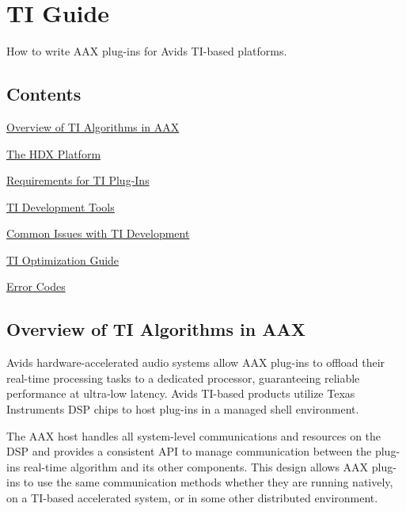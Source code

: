 \hypertarget{a00362}{}\section{T\+I Guide}
\label{a00362}
How to write A\+A\+X plug-\/ins for Avid\textquotesingle{}s T\+I-\/based platforms. 

\hypertarget{a00362_aax_ti_guide_contents}{}\subsection{Contents}\label{a00362_aax_ti_guide_contents}
\begin{DoxyItemize}
\item \hyperlink{a00362_aax_ti_guide_00_overview_of_ti_algorithms}{Overview of T\+I Algorithms in A\+A\+X} \item \hyperlink{a00362_aax_ti_guide_01_the_hdx_platform}{The H\+D\+X Platform} \item \hyperlink{a00362_aax_ti_guide_03_requirements_for_ti_plug_ins}{Requirements for T\+I Plug-\/\+Ins} \item \hyperlink{a00362_aax_ti_guide_04_ti_development_tools}{T\+I Development Tools} \item \hyperlink{a00362_aax_ti_guide_05_common_issues_with_ti_development}{Common Issues with T\+I Development} \item \hyperlink{a00362_aax_ti_guide_06_ti_optimization_guide}{T\+I Optimization Guide} \item \hyperlink{a00362_aax_ti_guide_07_error_codes}{Error Codes}\end{DoxyItemize}
 \hypertarget{a00362_aax_ti_guide_00_overview_of_ti_algorithms}{}\subsection{Overview of T\+I Algorithms in A\+A\+X}\label{a00362_aax_ti_guide_00_overview_of_ti_algorithms}
Avid\textquotesingle{}s hardware-\/accelerated audio systems allow A\+A\+X plug-\/ins to offload their real-\/time processing tasks to a dedicated processor, guaranteeing reliable performance at ultra-\/low latency. Avid\textquotesingle{}s T\+I-\/based products utilize Texas Instruments D\+S\+P chips to host plug-\/ins in a managed shell environment.

The A\+A\+X host handles all system-\/level communications and resources on the D\+S\+P and provides a consistent A\+P\+I to manage communication between the plug-\/in\textquotesingle{}s real-\/time algorithm and its other components. This design allows A\+A\+X plug-\/ins to use the same communication methods whether they are running natively, on a T\+I-\/based accelerated system, or in some other distributed environment.

